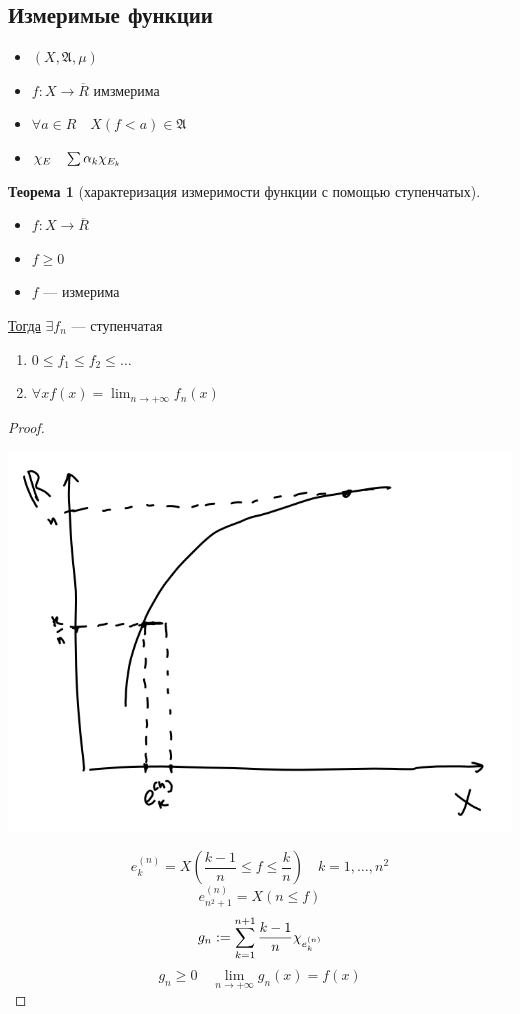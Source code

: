 \documentclass[oneside]{book}
\newcommand{\A}{\mathfrak{A}}
\theoremstyle{plain}
\theoremstyle{remark}
\theoremstyle{definition}
\newtheorem{theorem}{Теорема}[section]
\begin{document}
\subsection{Измеримые функции}
\label{sec:orgd400ca4}
\begin{itemize}
\item \((X, \A, \mu)\)
\item \(f: X \to \overline{R}\) имзмерима
\item \(\forall a \in R\quad X(f < a) \in \A\)
\item \(\chi_E\quad \sum \alpha_k \chi_{E_k}\)
\end{itemize}
\begin{theorem}[характеризация измеримости функции с помощью ступенчатых]
\-
\begin{itemize}
\item \(f: X \to \overline{R}\)
\item \(f \ge 0\)
\item \(f\) --- измерима
\end{itemize}
\uline{Тогда} \(\exists f_n\) --- ступенчатая
\begin{enumerate}
\item \(0 \le f_1 \le f_2 \le \dots\)
\item \(\forall x f(x) = \lim_{n \to + \infty}f_n(x)\)
\end{enumerate}
\label{orgeea44a3}
\end{theorem}
\begin{proof}
\begin{center}
\includegraphics[scale=0.5]{2_1.png}
\end{center}
\[ e^{(n)}_k = X(\frac{k - 1}{n} \le f \le \frac{k}{n}) \quad k = 1,\dots,n^2 \]
\[ e^{(n)}_{n^2 + 1} = X(n \le f) \]
\[ g_n := \sum^{n + 1}_{k = 1} \frac{k - 1}{n} \chi_{e^{(n)}_k} \]
\[ g_n \ge 0 \quad \lim_{n \to + \infty}g_n(x) = f(x) \]
\label{org02cb780}
\end{proof}
\end{document}
